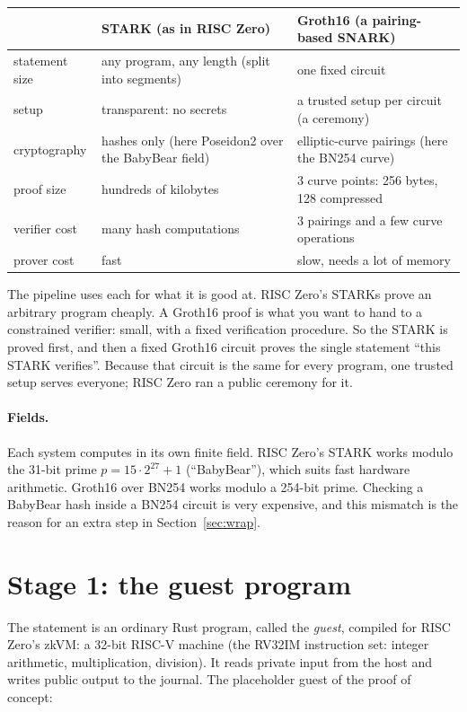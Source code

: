 \documentclass[11pt]{article}
\begin{document}
\begin{center}
\small
\begin{tabularx}{\linewidth}{@{}p{30mm}LL@{}}
\toprule
& STARK (as in RISC Zero) & Groth16 (a pairing-based SNARK) \\
\midrule
statement size & any program, any length (split into segments) & one fixed circuit \\
setup & transparent: no secrets & a trusted setup per circuit (a ceremony) \\
cryptography & hashes only (here Poseidon2 over the BabyBear field) & elliptic-curve pairings (here the BN254 curve) \\
proof size & hundreds of kilobytes & 3 curve points: 256 bytes, 128 compressed \\
verifier cost & many hash computations & 3 pairings and a few curve operations \\
prover cost & fast & slow, needs a lot of memory \\
\bottomrule
\end{tabularx}
\end{center}

The pipeline uses each for what it is good at. RISC Zero's STARKs prove
an arbitrary program cheaply. A Groth16 proof is what you want to hand
to a constrained verifier: small, with a fixed verification procedure.
So the STARK is proved first, and then a fixed Groth16 circuit proves
the single statement ``this STARK verifies''. Because that circuit is
the same for every program, one trusted setup serves everyone; RISC
Zero ran a public ceremony for it.

\paragraph{Fields.} Each system computes in its own finite field.
RISC Zero's STARK works modulo the 31-bit prime $p = 15 \cdot 2^{27} + 1$
(``BabyBear''), which suits fast hardware arithmetic. Groth16 over BN254
works modulo a 254-bit prime. Checking a BabyBear hash inside a BN254
circuit is very expensive, and this mismatch is the reason for an extra
step in Section~\ref{sec:wrap}.

\section{Stage 1: the guest program}
\label{sec:guest}

The statement is an ordinary Rust program, called the \emph{guest},
compiled for RISC Zero's zkVM: a 32-bit RISC-V machine (the RV32IM
instruction set: integer arithmetic, multiplication, division). It reads
private input from the host and writes public output to the journal.
The placeholder guest of the proof of concept:
\end{document}
